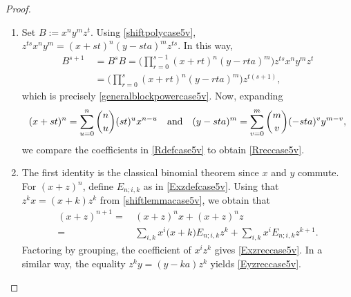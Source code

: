 \documentclass{amsart}
\theoremstyle{definition}
\theoremstyle{remark}
\numberwithin{equation}{section}
\begin{document}
\begin{proof}
\begin{enumerate}
\item [\rm (4)] Set $B:=x^n y^m z^t$. Using \eqref{shiftpolycase5v}, $z^{ts}x^n y^m=(x+st)^n(y-sta)^m z^{ts}$. In this way, 
\begin{align*}
B^{s+1}&\ =B^{s}B=\Big(\prod_{r=0}^{s-1}(x+rt)^n(y-rta)^m\Big)z^{ts} x^n y^m z^t \\
&\ =\Big(\prod_{r=0}^{s}(x+rt)^n(y-rta)^m\Big)z^{t(s+1)},
\end{align*}
which is precisely \eqref{generalblockpowercase5v}. Now, expanding 
$$
(x+st)^n=\sum_{u=0}^{n}\binom{n}{u}(st)^{u}x^{n-u} \quad {\rm and} \quad (y-sta)^m=\sum_{v=0}^{m}\binom{m}{v}(-sta)^{v}y^{m-v},
$$ 
we compare the coefficients in \eqref{Rdefcase5v} to obtain \eqref{Rreccase5v}.

\item [\rm (5)] The first identity is the classical binomial theorem since $x$ and $y$ commute. For $(x+z)^n$, define $E_{n;i,k}$ as in \eqref{Exzdefcase5v}. Using that $z^{k}x=(x+k)z^{k}$ from \eqref{shiftlemmacase5v}, we obtain that
\begin{align*}
 (x+z)^{n+1} = &\, (x+z)^n x+(x+z)^n z \\
 = &\, \sum_{i,k}x^{i}\big(x+k\big)E_{n;i,k}z^{k}+\sum_{i,k}x^{i}E_{n;i,k}z^{k+1}.
\end{align*}
Factoring by grouping, the coefficient of $x^i z^k$ gives \eqref{Exzreccase5v}. In a similar way, the equality $z^{k}y = (y-ka)z^{k}$ yields \eqref{Eyzreccase5v}.
\end{enumerate}
\end{proof}
\end{document}
